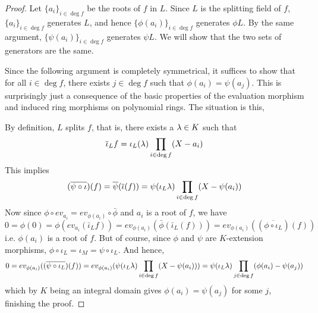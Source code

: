 \documentclass[../book.tex]{subfiles}
\begin{document}
\begin{proof}
    Let $\{a_i\}_{i\in\deg f}$ be the roots of $f$ in $L$. 
    Since $L$ is the splitting field of $f$, $\{a_i\}_{i\in\deg f}$ generates $L$,
    and hence $\{\phi(a_i)\}_{i\in\deg f}$ generates $\phi L$. 
    By the same argument, $\{\psi(a_i)\}_{i\in\deg f}$ generates $\psi L$. 
    We will show that the two sets of generators are the same.
    
    Since the following argument is completely symmetrical, it suffices to show
    that for all $i \in \deg f$, there exists $j \in \deg f$ such that
    $\phi(a_i) = \psi(a_j)$.
    This is surprisingly just a consequence
    of the basic properties of the evaluation morphism and 
    induced ring morphisms on polynomial rings.
    The situation is this, 
    \begin{figure}[H]
        \centering
    \end{figure}
    By definition, $L$ splits $f$, that is, there exists a $\lambda \in K$ such that 
    \[\overline{\iota}_L f = \iota_L(\lambda) \prod_{i\in\deg f}(X - a_i)\]
    This implies \[
        (\overline{\psi \circ \iota})(f) 
        = \overline{\psi}(\overline{\iota}(f))
        = \psi(\iota_L \lambda) \prod_{i\in\deg f} (X-\psi(a_i))
    \]
    Now since $\phi \circ ev_{a_i} = ev_{\phi(a_i)} \circ \bar\phi$
    and $a_i$ is a root of $f$, we have \[
        0 = \phi(0) = \phi (ev_{a_i} (\bar\iota_L f)) 
        = ev_{\phi(a_i)} (\bar\phi(\bar\iota_L (f)))
        = ev_{\phi(a_i)}((\overline{\phi \circ \iota_L}) (f))
    \]
    i.e. $\phi(a_i)$ is a root of $f$. 
    But of course, since $\phi$ and $\psi$ are $K$-extension morphisms,
    $\phi \circ \iota_L = \iota_M = \psi \circ \iota_L$.
    And hence, \[
        0 = ev_{\phi(a_i)}( (\overline{\psi \circ \iota_L})(f) )
        = ev_{\phi(a_i)} (\psi(\iota_L \lambda) \prod_{i\in\deg f} (X-\psi(a_i)))
        = \psi(\iota_L \lambda) \prod_{j\in\deg f} (\phi(a_i) -\psi(a_j))
    \]
    which by $K$ being an integral domain gives $\phi(a_i) = \psi(a_j)$
    for some $j$, finishing the proof. 
\end{proof}
\end{document}
